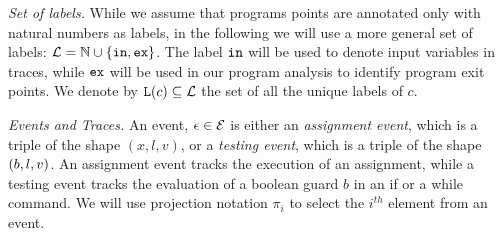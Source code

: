 \noindent\emph{Set of labels.} While we assume that programs points are annotated only with natural numbers as labels, in the following we will use a more general set of labels: $\mathcal{L} = \mathbb{N}\cup\{\mathtt{in},\mathtt{ex}\}$. The label $\mathtt{in}$ will be used to denote input variables in traces, while $\mathtt{ex}$ will be used in our program analysis to identify program exit points.
We denote by  $\mathtt{L}(c) \subseteq \mathcal{L}$ the set of all the unique labels of $c$.





\noindent\emph{Events and Traces.} 
An event, $\mathtt{\epsilon} \in \mathcal{E}$ is either an \emph{assignment event}, which is  a triple of the shape $({x}, l,v)$, or a \emph{testing event}, which is a triple of the shape $(b, l, v)$. An assignment event tracks the execution of an assignment, while a testing event tracks the evaluation
of a boolean guard $b$ in an if or a while command.
We will use projection notation $\pi_i$ to select the $i^{th}$ element
from an event.


